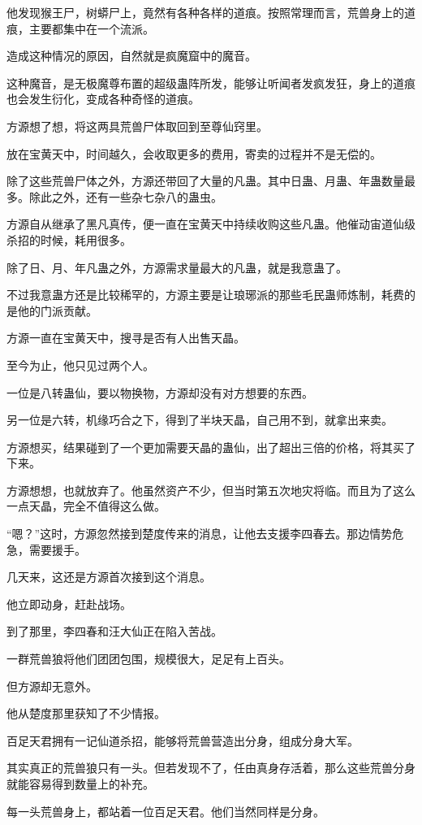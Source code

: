 \begin{this_body}
他发现猴王尸，树蟒尸上，竟然有各种各样的道痕。按照常理而言，荒兽身上的道痕，主要都集中在一个流派。

造成这种情况的原因，自然就是疯魔窟中的魔音。

这种魔音，是无极魔尊布置的超级蛊阵所发，能够让听闻者发疯发狂，身上的道痕也会发生衍化，变成各种奇怪的道痕。

方源想了想，将这两具荒兽尸体取回到至尊仙窍里。

放在宝黄天中，时间越久，会收取更多的费用，寄卖的过程并不是无偿的。

除了这些荒兽尸体之外，方源还带回了大量的凡蛊。其中日蛊、月蛊、年蛊数量最多。除此之外，还有一些杂七杂八的蛊虫。

方源自从继承了黑凡真传，便一直在宝黄天中持续收购这些凡蛊。他催动宙道仙级杀招的时候，耗用很多。

除了日、月、年凡蛊之外，方源需求量最大的凡蛊，就是我意蛊了。

不过我意蛊方还是比较稀罕的，方源主要是让琅琊派的那些毛民蛊师炼制，耗费的是他的门派贡献。

方源一直在宝黄天中，搜寻是否有人出售天晶。

至今为止，他只见过两个人。

一位是八转蛊仙，要以物换物，方源却没有对方想要的东西。

另一位是六转，机缘巧合之下，得到了半块天晶，自己用不到，就拿出来卖。

方源想买，结果碰到了一个更加需要天晶的蛊仙，出了超出三倍的价格，将其买了下来。

方源想想，也就放弃了。他虽然资产不少，但当时第五次地灾将临。而且为了这么一点天晶，完全不值得这么做。

“嗯？”这时，方源忽然接到楚度传来的消息，让他去支援李四春去。那边情势危急，需要援手。

几天来，这还是方源首次接到这个消息。

他立即动身，赶赴战场。

到了那里，李四春和汪大仙正在陷入苦战。

一群荒兽狼将他们团团包围，规模很大，足足有上百头。

但方源却无意外。

他从楚度那里获知了不少情报。

百足天君拥有一记仙道杀招，能够将荒兽营造出分身，组成分身大军。

其实真正的荒兽狼只有一头。但若发现不了，任由真身存活着，那么这些荒兽分身就能容易得到数量上的补充。

每一头荒兽身上，都站着一位百足天君。他们当然同样是分身。


\end{this_body}
